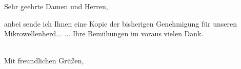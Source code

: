 %
%
%
%
%
%



\date{28.09.2015}			%


\subject{\textbf{Pressemitteilung Datenspuren 2015}}

\opening{Sehr geehrte Damen und Herren,}
anbei sende ich Ihnen eine Kopie der bisherigen Genehmigung für
unseren Mikrowellenherd...
... Ihre Bemühungen im voraus vielen Dank.\\\\


\closing{Mit freundlichen Grüßen,}






